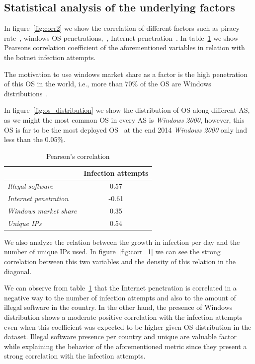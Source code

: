 \subsection{Statistical analysis of the underlying factors}
In figure~\ref{fig:corr2} we show the correlation of different factors such as piracy rate~\cite{pira}, windows OS penetrations,~\cite{win_pen}, Internet penetration~\cite{int_pen}. In table~\ref{tab:corr} we show Pearsons correlation coefficient of the aforementioned variables in relation with the botnet infection attempts.

The motivation to use windows market share as a factor is the high penetration of this OS in the world, i.e., more than 70\% of the OS are Windows distributions~\cite{os_pen}.

In figure~\ref{fig:os_distribution} we show the distribution of OS along different AS, as we might the most common OS in every AS is \textit{Windows 2000}, however, this OS is far to be the most deployed OS~\cite{os_pen} at the end 2014 \textit{Windows 2000} only had less than the 0.05\%.

\begin{table}[]
\centering
\caption{Pearson's correlation}
\label{tab:corr}
\begin{tabular}{l|c}
\multicolumn{1}{c|}{}                          & \textbf{Infection attempts} \\ \hline
\textit{Illegal software} & 0.57                        \\
\textit{Internet penetration}                  & -0.61                       \\
\textit{Windows market share}                  & 0.35                        \\
\textit{Unique IPs}                            & 0.54
\end{tabular}
\end{table}



 We also analyze the relation between the growth in infection per day and the number of unique IPs used. In figure~\ref{fig:corr_1} we can see the strong~\cite{pear_corr} correlation between this two variables and the density of this relation in the diagonal.

We can observe from table~\ref{tab:corr} that the Internet penetration is correlated in a negative way to the number of infection attempts and also to the amount of illegal software in the country. In the other hand, the presence of Windows distribution shows a moderate positive correlation with the infection attempts even when this coefficient was expected to be higher given OS distribution in the dataset. Illegal software presence per country and unique are valuable factor while explaining the behavior of the aforementioned metric since they present a strong correlation with the infection attempts.

